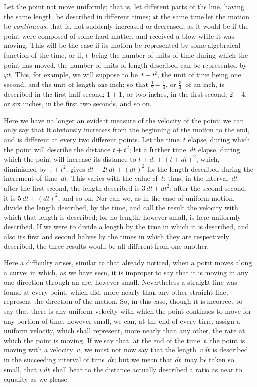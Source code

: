 \documentclass[12pt]{book}[2005/09/16]
\newcommand{\Pagelabel}[1]{\phantomsection\label{page:#1}}
\newcommand{\PageSep}[1]{\Pagelabel{#1}\ignorespaces}
\renewcommand{\(}{{\upshape(}}
\renewcommand{\)}{{\upshape)}}
\renewcommand{\phi}{\varphi}
\begin{document}
Let the point not move uniformly; that is, let different
%
%
parts of the line, having the same length, be
described in different times; at the same time let the
motion be \emph{continuous}, that is, not suddenly increased
or decreased, as it would be if the point were composed
of some hard matter, and received a blow while
it was moving. This will be the case if its motion be
represented by some algebraical function of the time,
or if, $t$~being the number of units of time during which
the point has moved, the number of units of length
described can be represented by~$\phi t$. This, for example,
we will suppose to be~$t + t^{2}$, the unit of time
being one second, and the unit of length one inch;
so that $\frac{1}{2} + \frac{1}{4}$, or $\frac{3}{4}$~of an inch, is described in the first
half second; $1 + 1$, or two inches, in the first second;
$2 + 4$, or six inches, in the first two seconds, and so on.

Here we have no longer an evident measure of the
velocity of the point; we can only say that it obviously
increases from the beginning of the motion to
the end, and is different at every two different points.
Let the time~$t$ elapse, during which the point will describe
the distance $t + t^{2}$; let a further time~$dt$ elapse,
during which the point will increase its distance to
$t + dt + (t + dt)^{2}$, which, diminished by~$t + t^{2}$, gives
\PageSep{54}
$dt + 2t\, dt + (dt)^{2}$ for the length described during the
increment of time~$dt$. This varies with the value of~$t$;
thus, in the interval~$dt$ after the first second, the
length described is $3\, dt + dt^{2}$; after the second second,
it is $5\, dt + (dt)^{2}$, and so on. Nor can we, as in the
case of uniform motion, divide the length described,
by the time, and call the result the velocity with which
that length is described; for no length, however small,
is here uniformly described. If we were to divide a
length by the time in which it is described, and also
its first and second halves by the times in which they
are respectively described, the three results would be
all different from one another.

Here a difficulty arises, similar to that already noticed,
when a point moves along a curve; in which,
as we have seen, it is improper to say that it is moving
in any one direction through an arc, however
small. Nevertheless a straight line was found at every
point, which did, more nearly than any other straight
line, represent the direction of the motion. So, in
this case, though it is incorrect to say that there is
any uniform velocity with which the point continues
to move for any portion of time, however small, we
can, at the end of every time, assign a uniform velocity,
which shall represent, more nearly than any
other, the rate at which the point is moving. If we
say that, at the end of the time~$t$, the point is moving
with a velocity~$v$, we must not now say that the length~$v\, dt$
is described in the succeeding interval of time~$dt$;
but we mean that $dt$~may be taken so small, that $v\, dt$~shall
bear to the distance actually described a ratio as
near to equality as we please.
\end{document}

